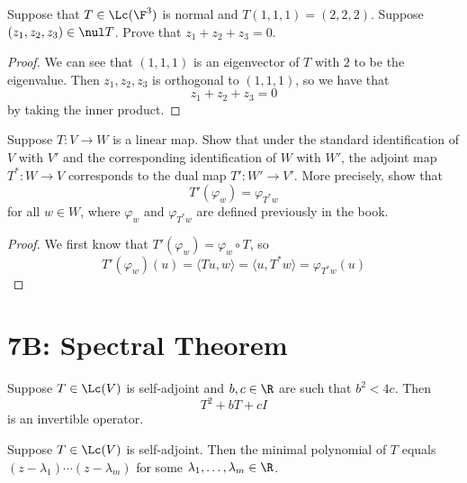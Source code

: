 \documentclass{extarticle}
\begin{document}
\begin{problem}{30}
    Suppose that \(T \in \Lc(\F^3)\) is normal and \(T(1, 1 ,1) = (2, 2, 2)\). Suppose
    \((z_1, z_2, z_3) \in \nul T\). Prove that \(z_1 + z_2 + z_3 = 0\).
\end{problem}

\begin{proof}
We can see that \((1,1,1)\) is an eigenvector of \(T\) with \(2\) to be the eigenvalue. Then
\(z_1, z_2, z_3\) is orthogonal to \((1,1,1)\), so we have that
\[z_1 + z_2 + z_3 = 0\]
by taking the inner product.
\end{proof}

\begin{problem}{32}
    Suppose \(T \colon V \to W\) is a linear map. Show that under the standard identification of
    \(V\) with \(V'\) and the corresponding identification of \(W\) with \(W'\), the adjoint map
    \(T^* \colon W \to V\) corresponds to the dual map \(T' \colon W' \to V'\). More precisely, show
    that
    \[T'(\varphi_w) = \varphi_{T^* w}\]
    for all \(w \in W\), where \(\varphi_w\) and \(\varphi_{T^* w}\) are defined previously in the
    book.
\end{problem}

\begin{proof}
We first know that \(T'(\varphi_w) = \varphi_w \circ T\), so
\[T'(\varphi_w)(u) = \langle Tu, w \rangle = \langle u, T^* w \rangle = \varphi_{T^* w}(u)\]
\end{proof}


\newpage
\section*{7B: Spectral Theorem}

\begin{lemma}
    Suppose \(T \in \Lc(V)\) is self-adjoint and \(b, c \in \R\) are such that \(b^2 < 4c\). Then
    \[T^2 + bT + cI\]
    is an invertible operator.
\end{lemma}

\begin{lemma}
    Suppose \(T \in \Lc(V)\) is self-adjoint. Then the minimal polynomial of \(T\) equals
    \((z - \lambda_1)\cdots(z - \lambda_m)\) for some \(\lambda_1, \ldots, \lambda_m \in \R\).
\end{lemma}
\end{document}
